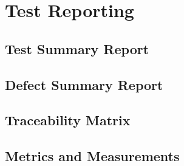 \chapter{Test Reporting}

\section{Test Summary Report}
\section{Defect Summary Report}
\section{Traceability Matrix}
\section{Metrics and Measurements}



